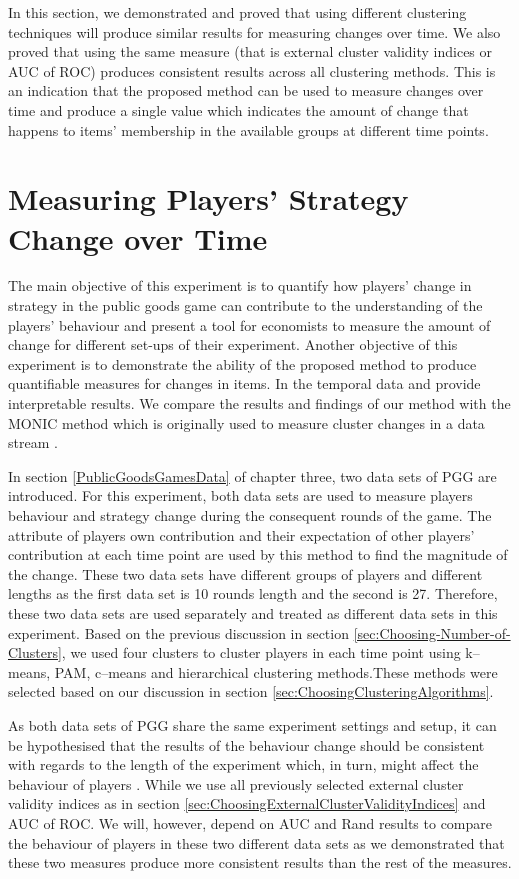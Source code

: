 In this section, we demonstrated and proved that using different clustering techniques will produce similar results for measuring changes over time. We also proved that using the same measure (that is external cluster validity indices or AUC of ROC) produces consistent results across all clustering methods. This is an indication that the proposed method can be used to measure changes over time and produce a single value which indicates the amount of change that happens to items' membership in the available groups at different time points.


\section{Measuring Players' Strategy Change over Time}
The main objective of this experiment is to quantify how players' change in strategy in the public goods game can contribute to the understanding of the players' behaviour and present a tool for economists to measure the amount of change for different set-ups of their experiment. Another objective of this experiment is to demonstrate the ability of the proposed method to produce quantifiable measures for changes in items. In the temporal data and provide interpretable results. We compare the results and findings of our method with the MONIC method which is originally used to measure cluster changes in a data stream  \cite{Spiliopoulou2006}.

In section \ref{PublicGoodsGamesData} of chapter three, two data sets of PGG are introduced. For this experiment,  both data sets are used to measure players behaviour and strategy change during the consequent rounds of the game. The attribute of players own contribution and their expectation of other players' contribution at each time point are used by this method to find the magnitude of the change. These two data sets have different groups of players and different lengths as the first data set is 10 rounds length and the second is 27. Therefore, these two data sets are used separately and treated as different data sets in this experiment. Based on the previous discussion in section \ref{sec:Choosing-Number-of-Clusters}, we used four clusters to cluster players in each time point using k--means, PAM, c--means and hierarchical clustering methods.These methods were selected based on our discussion in section \ref{sec:ChoosingClusteringAlgorithms}.

As both data sets of PGG share the same experiment settings and setup, it can be hypothesised that the results of the behaviour change should be consistent with regards to the length of the experiment which, in turn,  might affect the behaviour of players \cite{Figuieres2010}. While we use all previously selected external cluster validity indices as in section \ref{sec:ChoosingExternalClusterValidityIndices} and AUC of ROC. We will, however, depend on AUC and Rand results to compare the behaviour of players in these two different data sets as we demonstrated that these two measures produce more consistent results than the rest of the measures.


